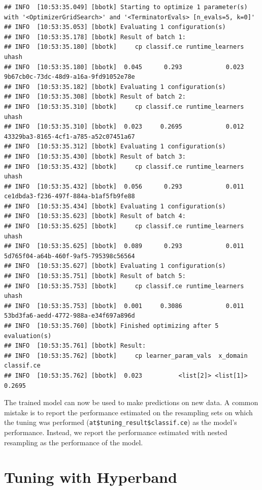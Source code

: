 \documentclass[
]{scrbook}
\begin{document}
\begin{verbatim}
## INFO  [10:53:35.049] [bbotk] Starting to optimize 1 parameter(s) with '<OptimizerGridSearch>' and '<TerminatorEvals> [n_evals=5, k=0]' 
## INFO  [10:53:35.053] [bbotk] Evaluating 1 configuration(s) 
## INFO  [10:53:35.178] [bbotk] Result of batch 1: 
## INFO  [10:53:35.180] [bbotk]     cp classif.ce runtime_learners                                uhash 
## INFO  [10:53:35.180] [bbotk]  0.045      0.293            0.023 9b67cb0c-73dc-48d9-a16a-9fd91052e78e 
## INFO  [10:53:35.182] [bbotk] Evaluating 1 configuration(s) 
## INFO  [10:53:35.308] [bbotk] Result of batch 2: 
## INFO  [10:53:35.310] [bbotk]     cp classif.ce runtime_learners                                uhash 
## INFO  [10:53:35.310] [bbotk]  0.023     0.2695            0.012 43329ba3-8165-4cf1-a785-a52c07451a67 
## INFO  [10:53:35.312] [bbotk] Evaluating 1 configuration(s) 
## INFO  [10:53:35.430] [bbotk] Result of batch 3: 
## INFO  [10:53:35.432] [bbotk]     cp classif.ce runtime_learners                                uhash 
## INFO  [10:53:35.432] [bbotk]  0.056      0.293            0.011 ce1dbda3-f236-497f-884a-b1af5fb9fe88 
## INFO  [10:53:35.434] [bbotk] Evaluating 1 configuration(s) 
## INFO  [10:53:35.623] [bbotk] Result of batch 4: 
## INFO  [10:53:35.625] [bbotk]     cp classif.ce runtime_learners                                uhash 
## INFO  [10:53:35.625] [bbotk]  0.089      0.293            0.011 5d765f04-a64b-460f-9af5-795398c56564 
## INFO  [10:53:35.627] [bbotk] Evaluating 1 configuration(s) 
## INFO  [10:53:35.751] [bbotk] Result of batch 5: 
## INFO  [10:53:35.753] [bbotk]     cp classif.ce runtime_learners                                uhash 
## INFO  [10:53:35.753] [bbotk]  0.001     0.3086            0.011 53bd3fa6-aedd-4772-988a-e34f697a896d 
## INFO  [10:53:35.760] [bbotk] Finished optimizing after 5 evaluation(s) 
## INFO  [10:53:35.761] [bbotk] Result: 
## INFO  [10:53:35.762] [bbotk]     cp learner_param_vals  x_domain classif.ce 
## INFO  [10:53:35.762] [bbotk]  0.023          <list[2]> <list[1]>     0.2695
\end{verbatim}

The trained model can now be used to make predictions on new data.
A common mistake is to report the performance estimated on the resampling sets on which the tuning was performed (\texttt{at\$tuning\_result\$classif.ce}) as the model's performance.
Instead, we report the performance estimated with nested resampling as the performance of the model.

\hypertarget{hyperband}{%
\section{Tuning with Hyperband}\label{hyperband}}
\end{document}
